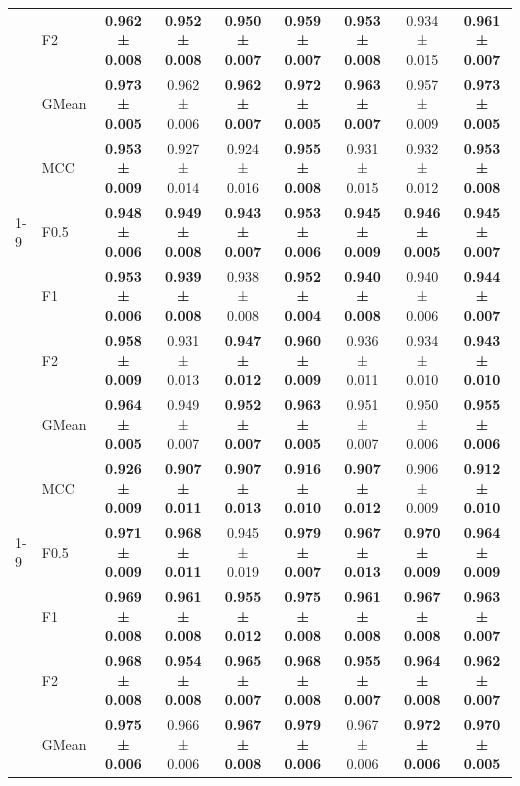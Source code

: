 \begin{table}[H]
{\begin{tabular}{llccccccc}
 & F2 & \textbf{0.962 ± 0.008} & \textbf{0.952 ± 0.008} & \textbf{0.950 ± 0.007} & \textbf{0.959 ± 0.007} & \textbf{0.953 ± 0.008} & 0.934 ± 0.015 & \textbf{0.961 ± 0.007} \\
 & GMean & \textbf{0.973 ± 0.005} & 0.962 ± 0.006 & \textbf{0.962 ± 0.007} & \textbf{0.972 ± 0.005} & \textbf{0.963 ± 0.007} & 0.957 ± 0.009 & \textbf{0.973 ± 0.005} \\
 & MCC & \textbf{0.953 ± 0.009} & 0.927 ± 0.014 & 0.924 ± 0.016 & \textbf{0.955 ± 0.008} & 0.931 ± 0.015 & 0.932 ± 0.012 & \textbf{0.953 ± 0.008} \\
\cline{1-9}
\multirow[t]{5}{*}{RandomForest} & F0.5 & \textbf{0.948 ± 0.006} & \textbf{0.949 ± 0.008} & \textbf{0.943 ± 0.007} & \textbf{0.953 ± 0.006} & \textbf{0.945 ± 0.009} & \textbf{0.946 ± 0.005} & \textbf{0.945 ± 0.007} \\
 & F1 & \textbf{0.953 ± 0.006} & \textbf{0.939 ± 0.008} & 0.938 ± 0.008 & \textbf{0.952 ± 0.004} & \textbf{0.940 ± 0.008} & 0.940 ± 0.006 & \textbf{0.944 ± 0.007} \\
 & F2 & \textbf{0.958 ± 0.009} & 0.931 ± 0.013 & \textbf{0.947 ± 0.012} & \textbf{0.960 ± 0.009} & 0.936 ± 0.011 & 0.934 ± 0.010 & \textbf{0.943 ± 0.010} \\
 & GMean & \textbf{0.964 ± 0.005} & 0.949 ± 0.007 & \textbf{0.952 ± 0.007} & \textbf{0.963 ± 0.005} & 0.951 ± 0.007 & 0.950 ± 0.006 & \textbf{0.955 ± 0.006} \\
 & MCC & \textbf{0.926 ± 0.009} & \textbf{0.907 ± 0.011} & \textbf{0.907 ± 0.013} & \textbf{0.916 ± 0.010} & \textbf{0.907 ± 0.012} & 0.906 ± 0.009 & \textbf{0.912 ± 0.010} \\
\cline{1-9}
\multirow[t]{5}{*}{TabICL} & F0.5 & \textbf{0.971 ± 0.009} & \textbf{0.968 ± 0.011} & 0.945 ± 0.019 & \textbf{0.979 ± 0.007} & \textbf{0.967 ± 0.013} & \textbf{0.970 ± 0.009} & \textbf{0.964 ± 0.009} \\
 & F1 & \textbf{0.969 ± 0.008} & \textbf{0.961 ± 0.008} & \textbf{0.955 ± 0.012} & \textbf{0.975 ± 0.008} & \textbf{0.961 ± 0.008} & \textbf{0.967 ± 0.008} & \textbf{0.963 ± 0.007} \\
 & F2 & \textbf{0.968 ± 0.008} & \textbf{0.954 ± 0.008} & \textbf{0.965 ± 0.007} & \textbf{0.968 ± 0.008} & \textbf{0.955 ± 0.007} & \textbf{0.964 ± 0.008} & \textbf{0.962 ± 0.007} \\
 & GMean & \textbf{0.975 ± 0.006} & 0.966 ± 0.006 & \textbf{0.967 ± 0.008} & \textbf{0.979 ± 0.006} & 0.967 ± 0.006 & \textbf{0.972 ± 0.006} & \textbf{0.970 ± 0.005} \\

\end{tabular}}
\end{table}
